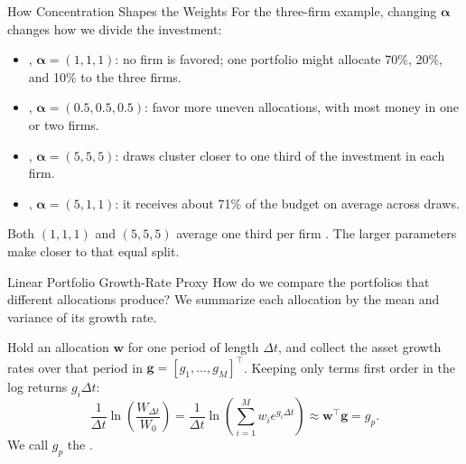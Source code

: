 \documentclass[aspectratio=169,11pt]{beamer}
\newcommand{\bw}{\mathbf{w}}
\newcommand{\bg}{\mathbf{g}}
\begin{document}
\begin{frame}{How Concentration Shapes the Weights}
  For the three-firm example, changing $\boldsymbol\alpha$ changes how we
  divide the investment:

  \vspace{0.4em}
  \begin{itemize}\setlength{\itemsep}{0.5em}
    \item {}, $\boldsymbol\alpha=(1,1,1)$:
      no firm is favored; one portfolio might allocate
      70\%, 20\%, and 10\% to the three firms.
    \item {}, $\boldsymbol\alpha=(0.5,0.5,0.5)$:
      favor more uneven allocations, with most money in one or two firms.
    \item {}, $\boldsymbol\alpha=(5,5,5)$:
      draws cluster closer to one third of the investment in each firm.
    \item {}, $\boldsymbol\alpha=(5,1,1)$:
      it receives about 71\% of the budget on average across draws.
  \end{itemize}

  \vspace{0.5em}
  Both $(1,1,1)$ and $(5,5,5)$ average one third per firm
  . The larger parameters make
   closer to that equal split.
\end{frame}

\begin{frame}{Linear Portfolio Growth-Rate Proxy}
  How do we compare the portfolios that different allocations produce?
  We summarize each allocation by the mean and variance of its growth rate.

  \vspace{0.5em}
  Hold an allocation $\bw$ for one period of length $\Delta t$, and collect
  the asset growth rates over that period in $\bg=[g_1,\ldots,g_M]^{\top}$.
  Keeping only terms first order in the log returns $g_i\Delta t$:
  \[
    \frac{1}{\Delta t}\ln\!\left(\frac{W_{\Delta t}}{W_0}\right)
    =\frac{1}{\Delta t}\ln\!\left(\sum_{i=1}^{M}w_i e^{g_i\Delta t}\right)
    \approx\bw^{\top}\bg=g_p.
  \]
  We call $g_p$ the .

\end{frame}
\end{document}
